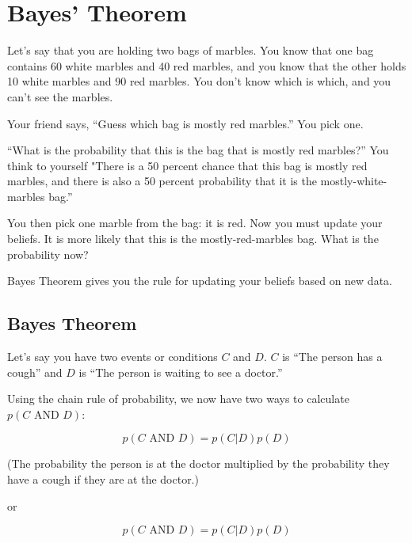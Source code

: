 \chapter{Bayes' Theorem}

Let's say that you are holding two bags of marbles.
You know that one bag contains 60 white marbles and 40 red marbles, and you
know that the other holds 10 white marbles and 90 red marbles. You
don't know which is which, and you can't see the marbles.

Your friend says, ``Guess which bag is mostly red marbles.'' You pick one.

``What is the probability that this is the bag that is mostly red marbles?''
 You think to yourself "There is a 50 percent chance that this bag is mostly red marbles, and there is
also a 50 percent probability that it is the mostly-white-marbles bag.''

You then pick one marble from the bag: it is red. Now you must
update your beliefs. It is more likely that this is the
mostly-red-marbles bag. What is the probability now?

Bayes Theorem gives you the rule for updating your beliefs based on
new data.

\section{Bayes Theorem}

Let's say you have two events or conditions $C$ and $D$. $C$ is
``The person has a cough'' and $D$ is ``The person is waiting to see a doctor.''

Using the chain rule of probability, we now have two ways to calculate $p(C \text{ AND } D)$:

$$p(C \text{ AND } D) = p(C | D) p(D)$$

(The probability the person is at the doctor multiplied by the probability they have a cough if they are at the doctor.)

or 

$$p(C \text{ AND } D) = p(C | D) p(D)$$

